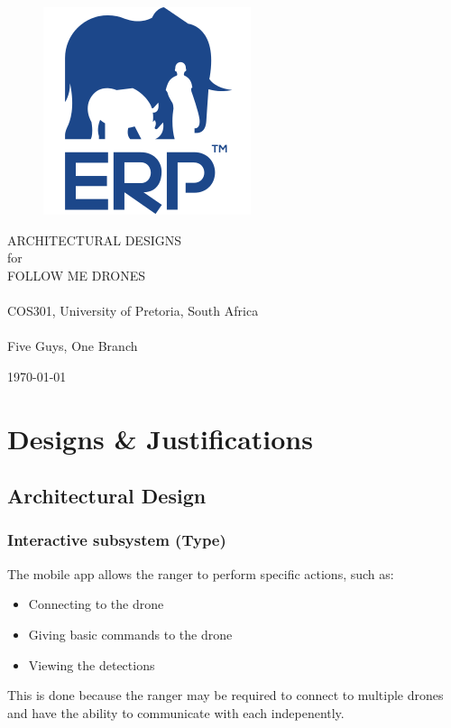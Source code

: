 \documentclass[a4paper,11pt]{book}
\begin{document}
\begin{titlepage}
	\begin{figure}[h!]
		\centering
		\includegraphics[scale=0.5]{./assets/images/erp-logo.png}
		\label{fig: erp-logo}
		\caption{}
	\end{figure}
	\vspace{0.5cm}
	\begin{center}
		\Huge{ARCHITECTURAL DESIGNS}\\
		for\\
		FOLLOW ME DRONES\\
		~\\
		\LARGE{COS301, University of Pretoria, South Africa}\\
		~\\
		Five Guys, One Branch
	\end{center}
	\begin{center}
		\today
	\end{center}
\end{titlepage}
\let\cleardoublepage\clearpage

\mainmatter

\chapter{Designs \& Justifications}

\section{Architectural Design}

\subsection{Interactive subsystem (Type)}

The mobile app allows the ranger to perform specific actions, such as:
\begin{itemize}
	\item Connecting to the drone
	\item Giving basic commands to the drone
	\item Viewing the detections
\end{itemize}
This is done because the ranger may be required to connect to multiple drones and have the ability to communicate with each indepenently.
\end{document}
